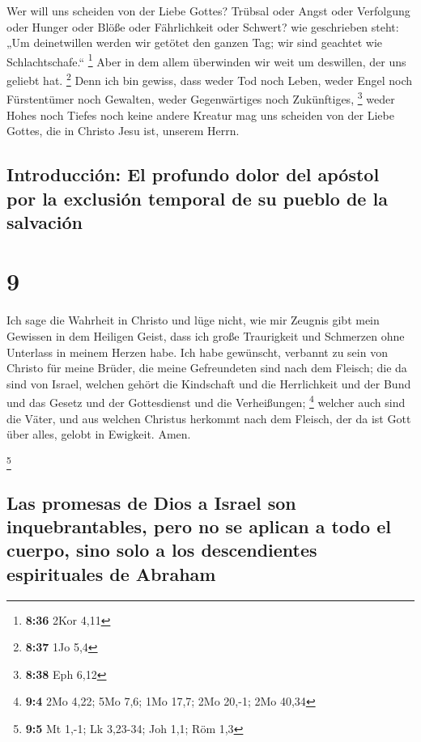  Wer will uns scheiden von der Liebe Gottes? Trübsal oder
Angst oder Verfolgung oder Hunger oder Blöße oder Fährlichkeit oder
Schwert?  wie geschrieben steht: „Um deinetwillen werden
wir getötet den ganzen Tag; wir sind geachtet wie Schlachtschafe.``
\footnote{\textbf{8:36} 2Kor 4,11}  Aber in dem allem
überwinden wir weit um deswillen, der uns geliebt hat. \footnote{\textbf{8:37}
  1Jo 5,4}  Denn ich bin gewiss, dass weder Tod noch
Leben, weder Engel noch Fürstentümer noch Gewalten, weder Gegenwärtiges
noch Zukünftiges, \footnote{\textbf{8:38} Eph 6,12} 
weder Hohes noch Tiefes noch keine andere Kreatur mag uns scheiden von
der Liebe Gottes, die in Christo Jesu ist, unserem Herrn.

\hypertarget{introducciuxf3n-el-profundo-dolor-del-apuxf3stol-por-la-exclusiuxf3n-temporal-de-su-pueblo-de-la-salvaciuxf3n}{%
\subsection{Introducción: El profundo dolor del apóstol por la exclusión
temporal de su pueblo de la
salvación}\label{introducciuxf3n-el-profundo-dolor-del-apuxf3stol-por-la-exclusiuxf3n-temporal-de-su-pueblo-de-la-salvaciuxf3n}}

\hypertarget{section-8}{%
\section{9}\label{section-8}}

 Ich sage die Wahrheit in Christo und lüge nicht, wie mir
Zeugnis gibt mein Gewissen in dem Heiligen Geist,  dass
ich große Traurigkeit und Schmerzen ohne Unterlass in meinem Herzen
habe.  Ich habe gewünscht, verbannt zu sein von Christo
für meine Brüder, die meine Gefreundeten sind nach dem Fleisch;
 die da sind von Israel, welchen gehört die Kindschaft und
die Herrlichkeit und der Bund und das Gesetz und der Gottesdienst und
die Verheißungen; \footnote{\textbf{9:4} 2Mo 4,22; 5Mo 7,6; 1Mo 17,7;
  2Mo 20,-1; 2Mo 40,34}  welcher auch sind die Väter, und
aus welchen Christus herkommt nach dem Fleisch, der da ist Gott über
alles, gelobt in Ewigkeit. Amen.

\footnote{\textbf{9:5} Mt 1,-1; Lk 3,23-34; Joh 1,1; Röm 1,3}

\hypertarget{las-promesas-de-dios-a-israel-son-inquebrantables-pero-no-se-aplican-a-todo-el-cuerpo-sino-solo-a-los-descendientes-espirituales-de-abraham}{%
\subsection{Las promesas de Dios a Israel son inquebrantables, pero no
se aplican a todo el cuerpo, sino solo a los descendientes espirituales
de
Abraham}\label{las-promesas-de-dios-a-israel-son-inquebrantables-pero-no-se-aplican-a-todo-el-cuerpo-sino-solo-a-los-descendientes-espirituales-de-abraham}}

